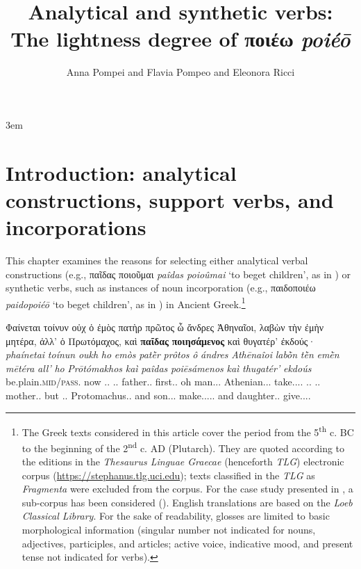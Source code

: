 \documentclass[output=paper,colorlinks,citecolor=brown]{langscibook}
\author{Anna Pompei\affiliation{Roma Tre University} and         Flavia Pompeo\affiliation{Sapienza University of Rome} and Eleonora Ricci\affiliation{Sapienza University of Rome; Roma Tre University}}
\title{Analytical and synthetic verbs: The lightness degree of ποιέω \textit{poiéō}}
\begin{document}
\emergencystretch 3em
\maketitle


\section{Introduction: analytical constructions, support verbs, and incorporations}\label{Section1}
This chapter examines the reasons for selecting either analytical verbal constructions (e.g., παῖδας ποιοῦμαι \textit{paîdas poioûmai} `to beget children', as in ) or synthetic verbs, such as instances of noun incorporation (e.g., παιδοποιέω \textit{paidopoiéō} `to beget children', as in ) in Ancient Greek.\footnote{The Greek texts considered in this article cover the period from the 5\textsuperscript{th} c. BC to the beginning of the 2\textsuperscript{nd} c. AD (Plutarch). They are quoted according to the editions in the \textit{Thesaurus Linguae Graecae} (henceforth \textit{TLG}) electronic corpus (\url{https://stephanus.tlg.uci.edu}); texts classified in the \textit{TLG} as \textit{Fragmenta} were excluded from the corpus. For the case study presented in , a sub-corpus has been considered (). English translations are based on the \textit{Loeb Classical Library}. For the sake of readability, glosses are limited to basic morphological information (singular number not indicated for nouns, adjectives, participles, and articles; active voice, indicative mood, and present tense not indicated for verbs).}

%	 

\ea \label{ex:1}
	\glll Φαίνεται	τοίνυν	οὐχ	ὁ ἐμὸς 	πατὴρ	πρῶτος ὦ 	ἄνδρες        Ἀθηναῖοι, 	λαβὼν 			τὴν		ἐμὴν 		μητέρα, ἀλλ’ ὁ 		Πρωτόμαχος,		καὶ	\textbf{παῖδας}		\textbf{ποιησάμενος}	   	   καὶ θυγατέρ’		ἐκδούς·\\
	\textit{phaínetai}		\textit{toínun}		\textit{oukh} 	\textit{ho}	 	\textit{emòs}		\textit{patḕr}		\textit{prôtos} 	\textit{ô}	\textit{ándres}	       \textit{Athēnaîoi}		\textit{labṑn}			\textit{tḕn}		\textit{emḕn}		\textit{mētéra}	\textit{all’}	  \textit{ho}		\textit{Prōtómakhos}		\textit{kaì}	\textit{paîdas}		\textit{poiēsámenos}	   	   \textit{kaì}     \textit{thugatér’} 		\textit{ekdoús}\\
	be.plain.\textsc{mid/pass}.\Tsg{}	now		\Neg{}	\Art{}.\Nom{}.\M{}	\Poss{}.\Nom{}.\M{}	father.\Nom{}.\M{}	first.\Nom{}.\M{}	oh	man.\Voc{}.\M{}.\Pl{} Athenian.\Voc{}.\M{}.\Pl{}	take.\Aor{}.\Ptcp{}.\Nom{}.\M{}	\Art{}.\Acc{}.\F{}	\Poss{}.\Acc{}.\F{}	mother.\Acc{}.\F{}	but	 \Art{}.\Nom{}.\M{}	Protomachus.\Nom{}.\M{}	and	son.\Acc{}.\M{}.\Pl{}	make.\Aor{}.\Ptcp{}.\Mid{}.\Nom{}.\M{}  and	 daughter.\Acc{}.\F{} 	give.\Aor{}.\Ptcp{}.\Nom{}.\M{}\\
\end{document}
